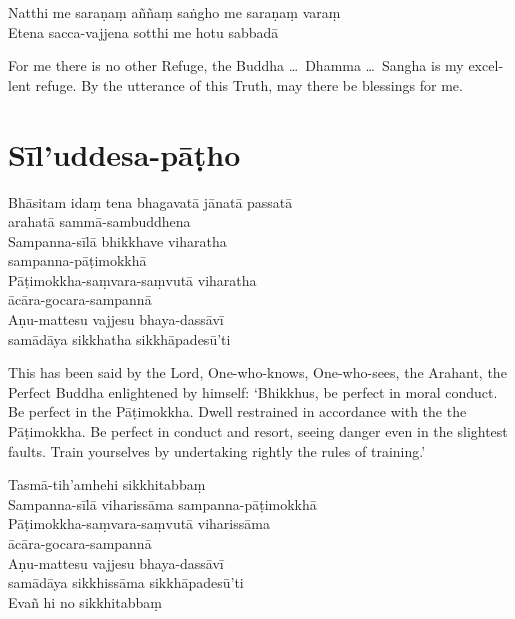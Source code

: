 Natthi me saraṇaṃ aññaṃ saṅgho me saraṇaṃ varaṃ\\
Etena sacca-vajjena sotthi me hotu sabbadā


\begin{english}
  For me there is no other Refuge, the Buddha \ldots\ Dhamma \ldots\ Sangha is
  my excellent refuge. By the utterance of this Truth, may there be blessings
  for me.
\end{english}

\section{Sīl'uddesa-pāṭho}

\begin{leader}
\end{leader}


Bhāsitam idaṃ tena bhagavatā jānatā passatā\\
arahatā sammā-sambuddhena\\
Sampanna-sīlā bhikkhave viharatha\\
sampanna-pāṭimokkhā\\
Pāṭimokkha-saṃvara-saṃvutā viharatha\\
ācāra-gocara-sampannā\\
Aṇu-mattesu vajjesu bhaya-dassāvī\\
samādāya sikkhatha sikkhāpadesū'ti


\begin{english}
  This has been said by the Lord, One-who-knows, One-who-sees, the Arahant, the
  Perfect Buddha enlightened by himself: `Bhikkhus, be perfect in moral
  conduct. Be perfect in the Pāṭimokkha. Dwell restrained in accordance with the
  the Pāṭimokkha. Be perfect in conduct and resort, seeing danger even in the
  slightest faults. Train yourselves by undertaking rightly the rules of training.'
\end{english}

Tasmā-tih'amhehi sikkhitabbaṃ\\
Sampanna-sīlā viharissāma sampanna-pāṭimokkhā\\
Pāṭimokkha-saṃvara-saṃvutā viharissāma\\
ācāra-gocara-sampannā\\
Aṇu-mattesu vajjesu bhaya-dassāvī\\
samādāya sikkhissāma sikkhāpadesū'ti\\
Evañ hi no sikkhitabbaṃ

